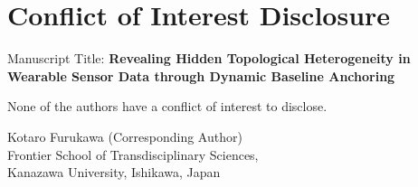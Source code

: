 \documentclass[12pt]{article}
\begin{document}
\section*{Conflict of Interest Disclosure}

Manuscript Title: \textbf{Revealing Hidden Topological Heterogeneity in Wearable Sensor Data through Dynamic Baseline Anchoring}
\vspace{1cm}

\noindent None of the authors have a conflict of interest to disclose.

\vspace{2cm}
\noindent Kotaro Furukawa (Corresponding Author)\\
Frontier School of Transdisciplinary Sciences, \\
Kanazawa University, Ishikawa, Japan
\end{document}
